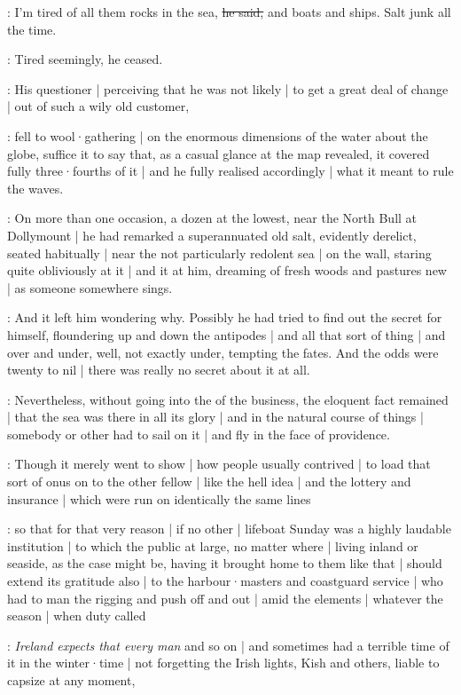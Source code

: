 \Murphy:
I'm tired of all them rocks in the sea,
\sout{he said,}
and boats and ships.
Salt junk all the time.

:
Tired seemingly,
he ceased.

:
His questioner |
perceiving that he was not likely |
to get a great deal of change |
out of such a wily old customer,

:
fell to wool·gathering |
on the enormous dimensions of the water about the globe,
suffice it to say that,
as a casual glance at the map revealed,
it covered fully three·fourths of it |
and he fully realised accordingly |
what it meant to rule the waves.

:
On more than one occasion,
a dozen at the lowest,
near the North Bull at Dollymount |
he had remarked a superannuated old salt,
evidently derelict,
seated habitually |
near the not particularly redolent sea |
on the wall,
staring quite obliviously at it |
and it at him,
dreaming of fresh woods and pastures new |
as someone somewhere sings.

:
And it left him wondering why.
Possibly he had tried to find out the secret for himself,
floundering up and down the antipodes |
and all that sort of thing |
and over and under,
well,
not exactly under,
tempting the fates.
And the odds were twenty to nil |
there was really no secret about it at all.

:
Nevertheless,
without going into the  of the business,
the eloquent fact remained |
that the sea was there in all its glory |
and in the natural course of things |
somebody or other had to sail on it |
and fly in the face of providence.%

:
Though it merely went to show |
how people usually contrived |
to load that sort of onus on to the other fellow |
like the hell idea |
and the lottery and insurance |
which were run on identically the same lines

:
so that for that very reason |
if no other |
lifeboat Sunday was a highly laudable institution |
to which the public at large,
no matter where |
living inland or seaside,
as the case might be,
having it brought home to them like that |
should extend its gratitude also |
to the harbour·masters and coastguard service |
who had to man the rigging and push off and out |
amid the elements |
whatever the season |
when duty called

:
\emph{Ireland expects that every man} and so on |
and sometimes had a terrible time of it in the winter·time |
not forgetting the Irish lights,
Kish and others,
liable to capsize at any moment,

